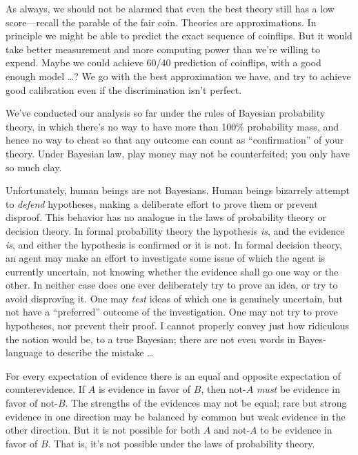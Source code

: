 {
 As always, we should not be alarmed that even the best theory
still has a low score---recall the parable of the fair coin. Theories
are approximations. In principle we might be able to predict the exact
sequence of coinflips. But it would take better measurement and more
computing power than we're willing to expend. Maybe we
could achieve 60/40 prediction of coinflips, with a good enough model
\ldots ? We go with the best approximation we have, and try to achieve
good calibration even if the discrimination isn't
perfect.}

\hr

{
 We've conducted our analysis so far under the
rules of Bayesian probability theory, in which there's
no way to have more than 100\% probability mass, and hence no way to
cheat so that any outcome can count as
``confirmation'' of your theory.
Under Bayesian law, play money may not be counterfeited; you only have
so much clay.}

{
 Unfortunately, human beings are not Bayesians. Human beings
bizarrely attempt to \textit{defend} hypotheses, making a deliberate
effort to prove them or prevent disproof. This behavior has no analogue
in the laws of probability theory or decision theory. In formal
probability theory the hypothesis \textit{is}, and the evidence
\textit{is}, and either the hypothesis is confirmed or it is not. In
formal decision theory, an agent may make an effort to investigate some
issue of which the agent is currently uncertain, not knowing whether
the evidence shall go one way or the other. In neither case does one
ever deliberately try to prove an idea, or try to avoid disproving it.
One may \textit{test} ideas of which one is genuinely uncertain, but
not have a ``preferred'' outcome of
the investigation. One may not try to prove hypotheses, nor prevent
their proof. I cannot properly convey just how ridiculous the notion
would be, to a true Bayesian; there are not even words in
Bayes-language to describe the mistake \ldots}

{
 For every expectation of evidence there is an equal and opposite
expectation of counterevidence. If $A$ is evidence in favor of $B$, then
not-$A$ \textit{must} be evidence in favor of not-$B$. The strengths of the
evidences may not be equal; rare but strong evidence in one direction
may be balanced by common but weak evidence in the other direction. But
it is not possible for both $A$ and not-$A$ to be evidence in favor of $B$.
That is, it's not possible under the laws of
probability theory.}


